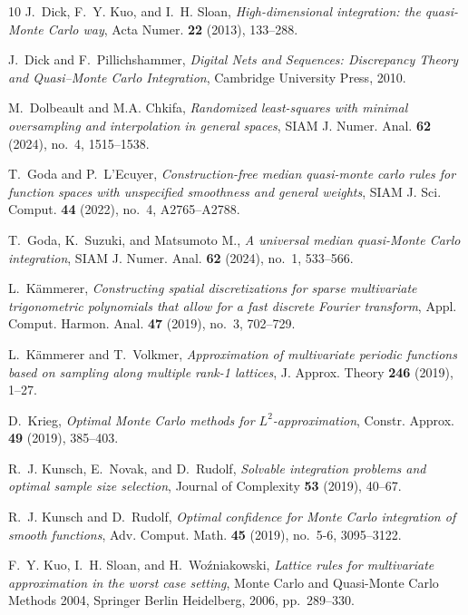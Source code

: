 \documentclass[a4paper,11pt]{article}
\begin{document}
\begin{thebibliography}{10}
J.~Dick, F.~Y. Kuo, and I.~H. Sloan, \emph{High-dimensional integration: the quasi-{M}onte {C}arlo way}, Acta Numer. \textbf{22} (2013), 133--288.

J.~Dick and F.~Pillichshammer, \emph{{Digital Nets and Sequences: Discrepancy Theory and Quasi–Monte Carlo Integration}}, Cambridge University Press, 2010.

M.~Dolbeault and M.A. Chkifa, \emph{{Randomized least-squares with minimal oversampling and interpolation in general spaces}}, SIAM J. Numer. Anal. \textbf{62} (2024), no.~4, 1515--1538.

T.~Goda and P.~L'Ecuyer, \emph{Construction-free median quasi-monte carlo rules for function spaces with unspecified smoothness and general weights}, SIAM J. Sci. Comput. \textbf{44} (2022), no.~4, A2765--A2788.

T.~Goda, K.~Suzuki, and Matsumoto M., \emph{A universal median quasi-{M}onte {C}arlo integration}, SIAM J. Numer. Anal. \textbf{62} (2024), no.~1, 533--566.

L.~K\"{a}mmerer, \emph{Constructing spatial discretizations for sparse multivariate trigonometric polynomials that allow for a fast discrete {F}ourier transform}, Appl. Comput. Harmon. Anal. \textbf{47} (2019), no.~3, 702--729.

L.~K{\"a}mmerer and T.~Volkmer, \emph{Approximation of multivariate periodic functions based on sampling along multiple rank-1 lattices}, J. Approx. Theory \textbf{246} (2019), 1--27.

D.~Krieg, \emph{{Optimal Monte Carlo methods for $L^2$-approximation}}, Constr. Approx. \textbf{49} (2019), 385--403.

R.~J. Kunsch, E.~Novak, and D.~Rudolf, \emph{Solvable integration problems and optimal sample size selection}, Journal of Complexity \textbf{53} (2019), 40--67.

R.~J. Kunsch and D.~Rudolf, \emph{Optimal confidence for {M}onte {C}arlo integration of smooth functions}, Adv. Comput. Math. \textbf{45} (2019), no.~5-6, 3095--3122.

F.~Y. Kuo, I.~H. Sloan, and H.~Wo{\'{z}}niakowski, \emph{Lattice rules for multivariate approximation in the worst case setting}, Monte Carlo and Quasi-Monte Carlo Methods 2004, Springer Berlin Heidelberg, 2006, pp.~289--330.


\end{thebibliography}
\end{document}
